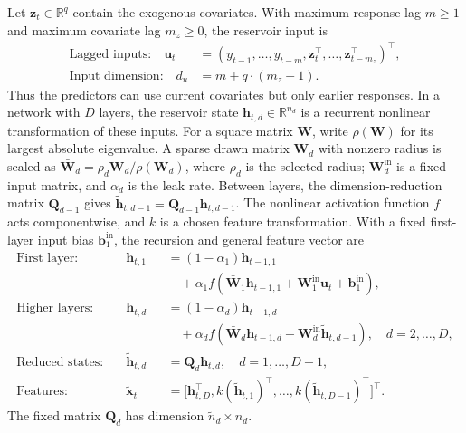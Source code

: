 \documentclass[12pt,letterpaper]{article}
\numberwithin{equation}{section}
\newcommand{\R}{\mathbb{R}}
\newcommand{\vect}[1]{\bm{#1}}
\newcommand{\mat}[1]{\bm{#1}}
\begin{document}
Let \(\vect z_t\in\R^q\) contain the exogenous covariates. With maximum
response lag \(m\geq1\) and maximum covariate lag \(m_z\geq0\), the
reservoir input is
\begin{equation}
\begin{aligned}
\text{Lagged inputs:}\quad
\vect u_t&=(y_{t-1},\ldots,y_{t-m},
\vect z_t^\top,\ldots,\vect z_{t-m_z}^\top)^\top,\\
\text{Input dimension:}\quad d_u&=m+q\cdot(m_z+1).
\end{aligned}
\label{eq:desn-input-main}
\end{equation}
Thus the predictors can use current covariates but only earlier responses.
In a network with \(D\) layers, the reservoir state
\(\vect h_{t,d}\in\R^{n_d}\) is a recurrent nonlinear transformation of
these inputs. For a square matrix \(\mat W\), write \(\rho(\mat W)\)
for its largest absolute eigenvalue. A sparse drawn matrix \(\mat W_d\)
with nonzero radius is scaled as
\(\bar{\mat W}_d=\rho_d\mat W_d/\rho(\mat W_d)\), where \(\rho_d\)
is the selected radius;
\(\mat W_d^{\mathrm{in}}\) is a fixed input matrix, and \(\alpha_d\) is the
leak rate. Between layers, the dimension-reduction matrix \(\mat Q_{d-1}\) gives
\(\tilde{\vect h}_{t,d-1}=\mat Q_{d-1}\vect h_{t,d-1}\).
The nonlinear activation function \(f\) acts componentwise, and \(k\) is a chosen feature
transformation.
With a fixed first-layer input bias \(\vect b_1^{\mathrm{in}}\), the
recursion and general feature vector are
\begin{equation}
\begin{alignedat}{2}
\text{First layer:}\quad &\vect h_{t,1}
&&=(1-\alpha_1)\vect h_{t-1,1}\\
&&&\quad+\alpha_1 f(\bar{\mat W}_1\vect h_{t-1,1}
+\mat W_1^{\mathrm{in}}\vect u_t+\vect b_1^{\mathrm{in}}),\\
\text{Higher layers:}\quad &\vect h_{t,d}
&&=(1-\alpha_d)\vect h_{t-1,d}\\
&&&\quad+\alpha_d f(\bar{\mat W}_d\vect h_{t-1,d}
+\mat W_d^{\mathrm{in}}\tilde{\vect h}_{t,d-1}),\quad d=2,\ldots,D,\\
\text{Reduced states:}\quad &\tilde{\vect h}_{t,d}
&&=\mat Q_d\vect h_{t,d},\quad d=1,\ldots,D-1,\\
\text{Features:}\quad &\tilde{\vect x}_t
&&=\big[\vect h_{t,D}^\top,k(\tilde{\vect h}_{t,1})^\top,\ldots,
k(\tilde{\vect h}_{t,D-1})^\top\big]^\top.
\end{alignedat}
\label{eq:desn-hierarchy}
\end{equation}
The fixed matrix \(\mat Q_d\) has dimension \(\tilde n_d\times n_d\).
\end{document}
